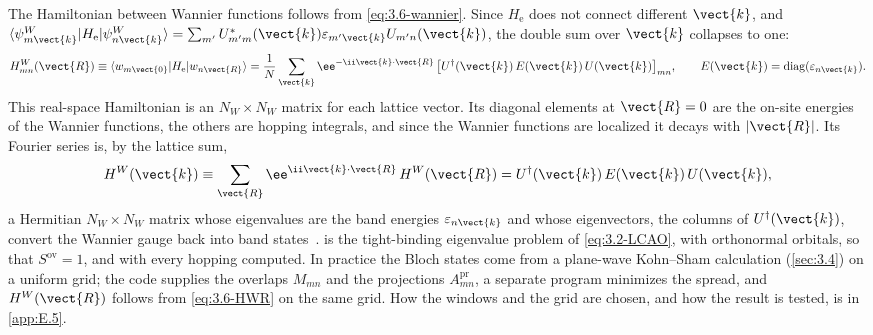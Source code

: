The Hamiltonian between Wannier functions follows from \cref{eq:3.6-wannier}. Since $H_{\mathrm{e}}$ does not connect different $\vect{k}$, and $\langle\psi^W_{m\vect{k}}|H_{\mathrm{e}}|\psi^W_{n\vect{k}}\rangle = \sum_{m'}U^*_{m'm}(\vect{k})\varepsilon_{m'\vect{k}}U_{m'n}(\vect{k})$, the double sum over $\vect{k}$ collapses to one:
\begin{equation}
  H^W_{mn}(\vect{R}) \equiv \langle w_{m\vect{0}}|H_{\mathrm{e}}|w_{n\vect{R}}\rangle
  = \frac1N\sum_{\vect{k}}\ee^{-\ii\vect{k}\cdot\vect{R}}\,\bigl[U^\dagger(\vect{k})\,E(\vect{k})\,U(\vect{k})\bigr]_{mn},
  \qquad E(\vect{k}) = \mathrm{diag}(\varepsilon_{n\vect{k}}) .
  \label{eq:3.6-HWR}
\end{equation}
This real-space Hamiltonian is an $N_W\times N_W$ matrix for each lattice vector. Its diagonal elements at $\vect{R} = 0$ are the on-site energies of the Wannier functions, the others are hopping integrals, and since the Wannier functions are localized it decays with $|\vect{R}|$. Its Fourier series is, by the lattice sum,
\begin{equation}
  H^W(\vect{k}) \equiv \sum_{\vect{R}}\ee^{\ii\vect{k}\cdot\vect{R}}\,H^W(\vect{R}) = U^\dagger(\vect{k})\,E(\vect{k})\,U(\vect{k}) ,
  \label{eq:3.6-HWk}
\end{equation}
a Hermitian $N_W\times N_W$ matrix whose eigenvalues are the band energies $\varepsilon_{n\vect{k}}$ and whose eigenvectors, the columns of $U^\dagger(\vect{k})$, convert the Wannier gauge back into band states~\cite[Eqs.~(98) and (99)]{marzari2012maximally}.  is the tight-binding eigenvalue problem of \cref{eq:3.2-LCAO}, with orthonormal orbitals, so that $S^{\mathrm{ov}} = 1$, and with every hopping computed. In practice the Bloch states come from a plane-wave Kohn--Sham calculation (\cref{sec:3.4}) on a uniform grid; the code supplies the overlaps $M_{mn}$ and the projections $A^{\mathrm{pr}}_{mn}$, a separate program minimizes the spread, and $H^W(\vect{R})$ follows from \cref{eq:3.6-HWR} on the same grid. How the windows and the grid are chosen, and how the result is tested, is in \cref{app:E.5}.

